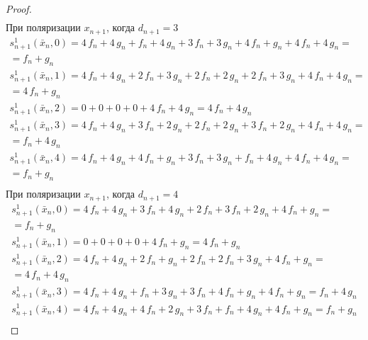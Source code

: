 \documentclass[bibliography=totoc, a4paper, 14pt]{extarticle}
\begin{document}
\begin{proof}
$$\begin{array}{l}
\end{array}$$
При поляризации $x_{n+1}$, когда $d_{n+1} = 3$
$$\begin{array}{l}
s_{n+1}^1(\bar{x}_n, 0) = 4\,f_n + 4\,g_n + f_n + 4\,g_n + 3\,f_n + 3\,g_n + 4\,f_n + g_n + 4\,f_n + 4\,g_n =\\
= f_n + g_n \\
s_{n+1}^1(\bar{x}_n, 1) = 4\,f_n + 4\,g_n + 2\,f_n + 3\,g_n + 2\,f_n + 2\,g_n + 2\,f_n + 3\,g_n + 4\,f_n + 4\,g_n =\\
= 4\,f_n + g_n \\
s_{n+1}^1(\bar{x}_n, 2) = 0 + 0 + 0 + 0 + 4\,f_n + 4\,g_n = 4\,f_n + 4\,g_n \\
s_{n+1}^1(\bar{x}_n, 3) = 4\,f_n + 4\,g_n + 3\,f_n + 2\,g_n + 2\,f_n + 2\,g_n + 3\,f_n + 2\,g_n + 4\,f_n + 4\,g_n =\\
= f_n + 4\,g_n \\
s_{n+1}^1(\bar{x}_n, 4) = 4\,f_n + 4\,g_n + 4\,f_n + g_n + 3\,f_n + 3\,g_n + f_n + 4\,g_n + 4\,f_n + 4\,g_n =\\
= f_n + g_n \\
\end{array}$$
При поляризации $x_{n+1}$, когда $d_{n+1} = 4$
$$\begin{array}{l}
s_{n+1}^1(\bar{x}_n, 0) = 4\,f_n + 4\,g_n + 3\,f_n + 4\,g_n + 2\,f_n + 3\,f_n + 2\,g_n + 4\,f_n + g_n =\\
= f_n + g_n \\
s_{n+1}^1(\bar{x}_n, 1) = 0 + 0 + 0 + 0 + 4\,f_n + g_n = 4\,f_n + g_n \\
s_{n+1}^1(\bar{x}_n, 2) = 4\,f_n + 4\,g_n + 2\,f_n + g_n + 2\,f_n + 2\,f_n + 3\,g_n + 4\,f_n + g_n =\\
= 4\,f_n + 4\,g_n \\
s_{n+1}^1(\bar{x}_n, 3) = 4\,f_n + 4\,g_n + f_n + 3\,g_n + 3\,f_n + 4\,f_n + g_n + 4\,f_n + g_n = f_n + 4\,g_n \\
s_{n+1}^1(\bar{x}_n, 4) = 4\,f_n + 4\,g_n + 4\,f_n + 2\,g_n + 3\,f_n + f_n + 4\,g_n + 4\,f_n + g_n = f_n + g_n \\
\end{array}$$

\end{proof}
\end{document}
